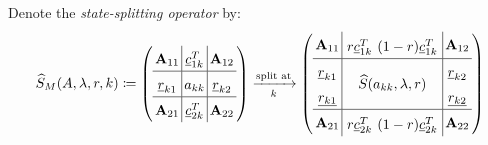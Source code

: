 \documentclass[handout]{beamer}
\begin{document}
{\begin{frame}
  Denote the \emph{state-splitting operator} by:
  \begin{align*}
    \arraycolsep=1.8pt\def\arraystretch{1.5}
    \widehat{S}_M(A,\lambda,r,k) \coloneqq \left( \begin{array}{c|c|c} \mathbf{A}_{11} & \underline{c}_{1k}^T & \mathbf{A}_{12}\\\hline \underline{r}_{k1} & a_{kk} & \underline{r}_{k2}\\\hline \mathbf{A}_{21} & \underline{c}_{2k}^T & \mathbf{A}_{22} \end{array} \right) \xrightarrow[k]{\text{split at}} \left( \begin{array}{c|c|c} \mathbf{A}_{11} & \begin{array}{cc} r\underline{c}_{1k}^T & (1-r) \underline{c}_{1k}^T \end{array} & \mathbf{A}_{12}\\\hline \underline{r}_{k1} & \multirow{2}{*}{$\widehat{S}(a_{kk},\lambda,r)$} & \underline{r}_{k2}\\\underline{r_{k1}} && \underline{r_{k2}}\\\hline \mathbf{A}_{21} & \begin{array}{cc} r \underline{c}_{2k}^T & (1-r) \underline{c}_{2k}^T \end{array} & \mathbf{A}_{22} \end{array} \right)
  \end{align*}

\end{frame}

}
\end{document}
